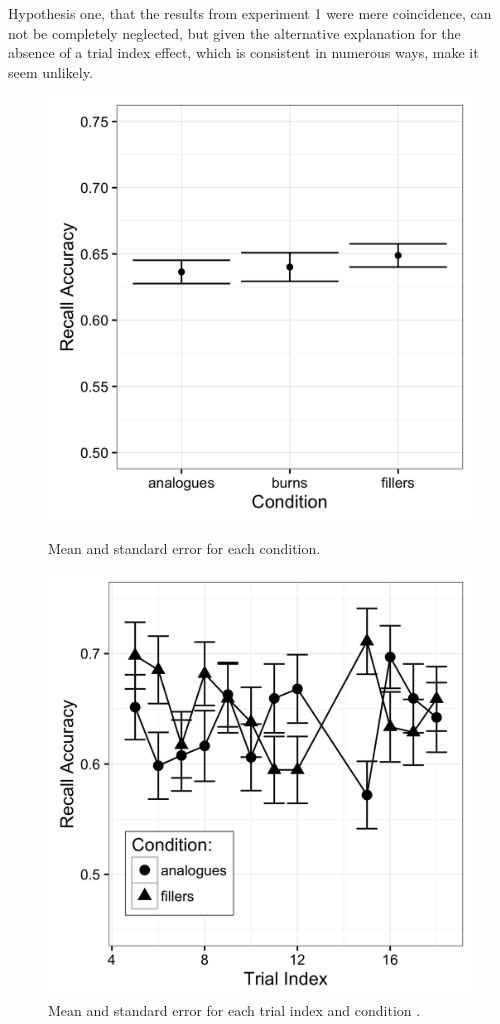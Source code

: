 \documentclass[a4paper,man,natbib,floatsintext,import]{apa6}
\begin{document}
Hypothesis one, that the results from experiment 1 were mere coincidence, can not be completely neglected, but given the alternative explanation for the absence of a trial index effect, which is consistent in numerous ways, make it seem unlikely.

\begin{figure}
\begin{minipage}[t]{.5\textwidth}
\includegraphics[width=.9\linewidth]{figures/conf2_conditionWburn.png}
\caption{Mean and standard error for each condition.}
\label{fig:conf2_conditionWburn}
\end{minipage}
\begin{minipage}[t]{.5\textwidth}
\includegraphics[width=.9\linewidth]{figures/main2.png}
\caption{Mean and standard error for each trial index and condition .}
\label{fig:main2}
\end{minipage}
\end{figure}
\end{document}
